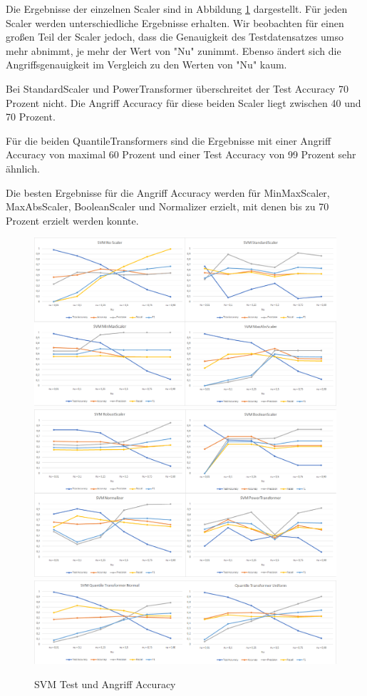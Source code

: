 \documentclass[12pt,a4paper]{scrartcl}
\numberwithin{equation}{section}
\begin{document}
Die Ergebnisse der einzelnen Scaler sind in Abbildung \ref{svm_results} dargestellt. Für jeden Scaler werden unterschiedliche Ergebnisse erhalten. Wir beobachten für einen großen Teil der Scaler jedoch, dass die Genauigkeit des Testdatensatzes umso mehr abnimmt, je mehr der Wert von "Nu" zunimmt. Ebenso ändert sich die Angriffsgenauigkeit im Vergleich zu den Werten von "Nu" kaum. 

Bei StandardScaler und PowerTransformer überschreitet der Test Accuracy 70 Prozent nicht. Die Angriff Accuracy für diese beiden Scaler liegt zwischen 40 und 70 Prozent.

Für die beiden QuantileTransformers sind die Ergebnisse mit einer Angriff Accuracy von maximal 60 Prozent und einer Test Accuracy von 99 Prozent sehr ähnlich.

Die besten Ergebnisse für die Angriff Accuracy werden für MinMaxScaler, MaxAbsScaler, BooleanScaler und Normalizer erzielt, mit denen bis zu 70 Prozent erzielt werden konnte. 

\begin{figure}[ht!]
	\centering
	  \includegraphics[scale=0.5]{svm_1.png}
	  \includegraphics[scale=0.5]{svm_2.png}
	  \includegraphics[scale=0.5]{svm_3.png}
	  \caption{SVM Test und Angriff Accuracy}
	\label{svm_results}
\end{figure}
\end{document}
